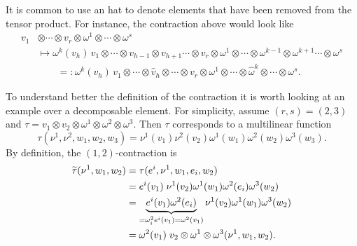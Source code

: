 \begin{notation}\label{notation:hat}
  It is common to use an hat to denote elements that have been removed from the tensor product.
  For instance, the contraction above would look like
  \begin{align}
    v_1 & \otimes\cdots\otimes v_r\otimes\omega^1\otimes\cdots\otimes\omega^s                                                                                                              \\
        & \mapsto \omega^k(v_h)\, v_1\otimes\cdots\otimes v_{h-1}\otimes v_{h+1}\cdots\otimes v_r\otimes\omega^1\otimes\cdots\otimes\omega^{k-1}\otimes\omega^{k+1}\cdots\otimes\omega^s   \\
        & \qquad  =: \omega^k(v_h)\, v_1\otimes\cdots\otimes \widehat{v}_{h} \otimes \cdots\otimes v_r\otimes\omega^1\otimes\cdots\otimes\widehat{\omega}^{k}\otimes\cdots\otimes\omega^s.
  \end{align}
\end{notation}

\begin{example}
  To understand better the definition of the contraction it is worth looking at an example over a decomposable element.
  For simplicity, assume $(r,s) = (2,3)$ and $\tau = v_1\otimes v_2\otimes\omega^1\otimes\omega^2\otimes\omega^3$.
  Then $\tau$ corresponds to a multilinear function
  \begin{equation}
    \tau(\nu^1,\nu^2,w_1,w_2,w_3) = \nu^1(v_1)\nu^2(v_2)\omega^1(w_1)\omega^2(w_2)\omega^3(w_3).
  \end{equation}
  By definition, the $(1,2)$-contraction is
  \begin{align}
    \widetilde\tau(\nu^1,w_1,w_2) & = \tau(e^i,\nu^1,w_1,e_i,w_2)                                                                                        \\
                                  & = e^i(v_1)\;\nu^1(v_2)\omega^1(w_1)\omega^2(e_i)\omega^3(w_2)                                                        \\
                                  & = \LaTeXunderbrace{e^i(v_1)\omega^2(e_i)}_{=\omega^2_i e^i (v_1) =\omega^2(v_1)}\nu^1(v_2)\omega^1(w_1)\omega^3(w_2) \\
                                  & = \omega^2(v_1)\; v_2\otimes\omega^1\otimes\omega^3 (\nu^1,w_1,w_2).
  \end{align}
\end{example}

